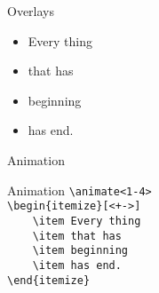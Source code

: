 \begin{frame}{Overlays}
    \begin{itemize}[<+->]
        \item Every thing
        \item that has
        \item beginning
        \item has end.
    \end{itemize}
\end{frame}

\begin{frame}{Animation\magicPage}

    \begin{itemize}
    \end{itemize}\vspace{5mm}
\end{frame}

\begin{frame}[fragile]{Animation\magicPage}
    \lstinline[basicstyle=\tt]|\animate<1-4>| \\
    \lstinline[basicstyle=\tt]|\begin{itemize}[<+->]| \\
    \lstinline[basicstyle=\tt]|    \item Every thing|   \\
    \lstinline[basicstyle=\tt]|    \item that has|   \\
    \lstinline[basicstyle=\tt]|    \item beginning| \\
    \lstinline[basicstyle=\tt]|    \item has end.|   \\
    \lstinline[basicstyle=\tt]|\end{itemize}|
\end{frame}

